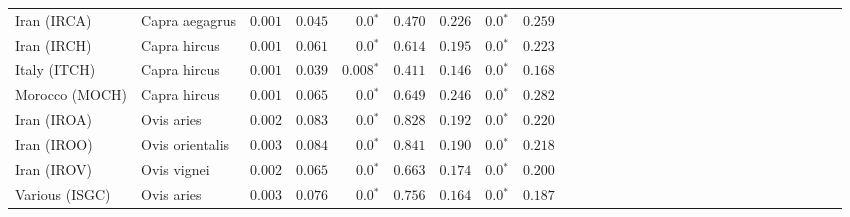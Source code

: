 \begin{center}
\begin{adjustbox}{width = 1\textwidth}
\begin{tabular}{|l|l|r|r|r|r|r|r|r|r|r|r|r|r|r|r|r|r|r|r|r|r|r|r|r|r|r|r|r|}
                    Iran (IRCA) &       Capra aegagrus &           $ 0.001$ &                      $ 0.045$ &                  $\bm{0.0{^*}}$ &                                           $ 0.470$ &                      $ 0.226$ &                  $\bm{0.0{^*}}$ &                                           $ 0.259$ \\
                    Iran (IRCH) &         Capra hircus &           $ 0.001$ &                      $ 0.061$ &                  $\bm{0.0{^*}}$ &                                           $ 0.614$ &                      $ 0.195$ &                  $\bm{0.0{^*}}$ &                                           $ 0.223$ \\
                   Italy (ITCH) &         Capra hircus &           $ 0.001$ &                      $ 0.039$ &               $\bm{ 0.008{^*}}$ &                                           $ 0.411$ &                      $ 0.146$ &                  $\bm{0.0{^*}}$ &                                           $ 0.168$ \\
                 Morocco (MOCH) &         Capra hircus &           $ 0.001$ &                      $ 0.065$ &                  $\bm{0.0{^*}}$ &                                           $ 0.649$ &                      $ 0.246$ &                  $\bm{0.0{^*}}$ &                                           $ 0.282$ \\
                    Iran (IROA) &           Ovis aries &           $ 0.002$ &                      $ 0.083$ &                  $\bm{0.0{^*}}$ &                                           $ 0.828$ &                      $ 0.192$ &                  $\bm{0.0{^*}}$ &                                           $ 0.220$ \\
                    Iran (IROO) &      Ovis orientalis &           $ 0.003$ &                      $ 0.084$ &                  $\bm{0.0{^*}}$ &                                           $ 0.841$ &                      $ 0.190$ &                  $\bm{0.0{^*}}$ &                                           $ 0.218$ \\
                    Iran (IROV) &          Ovis vignei &           $ 0.002$ &                      $ 0.065$ &                  $\bm{0.0{^*}}$ &                                           $ 0.663$ &                      $ 0.174$ &                  $\bm{0.0{^*}}$ &                                           $ 0.200$ \\
                 Various (ISGC) &           Ovis aries &           $ 0.003$ &                      $ 0.076$ &                  $\bm{0.0{^*}}$ &                                           $ 0.756$ &                      $ 0.164$ &                  $\bm{0.0{^*}}$ &                                           $ 0.187$ \\

\end{tabular}
\end{adjustbox}
\end{center}
